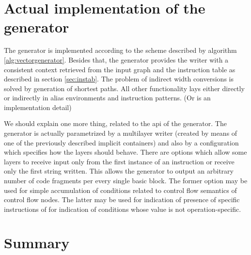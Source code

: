 \section{Actual implementation of the generator}

The generator is implemented according to the scheme described by algorithm \ref{alg:vectorgenerator}.  Besides that, the generator provides the writer with a consistent context retrieved from the input graph and the instruction table as described in section \ref{sec:instab}. The problem of indirect width conversions is solved by generation of shortest paths. All other functionality lays either directly or indirectly in alias environments and instruction patterns. (Or is an implementation detail)

We should explain one more thing, related to the api of the generator. The generator is actually parametrized by a multilayer writer (created by means of one of the previously described implicit containers) and also by a configuration which specifies how the layers should behave. There are options which allow some layers to receive input only from the first instance of an instruction or receive only the first string written. This allows the generator to output an arbitrary number of code fragments per every single basic block. The former option may be used for simple accumulation of conditions related to control flow semantics of control flow nodes. The latter may be used for indication of presence of specific instructions of for indication of conditions whose value is not operation-specific.




\section{Summary}


